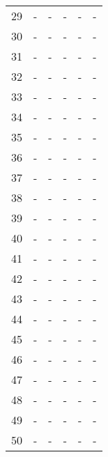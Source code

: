 \begin{table}
\begin{tabular}{llllll}
29 &   - &    - &    - &     - &        - \\
30 &   - &    - &    - &     - &        - \\
31 &   - &    - &    - &     - &        - \\
32 &   - &    - &    - &     - &        - \\
33 &   - &    - &    - &     - &        - \\
34 &   - &    - &    - &     - &        - \\
35 &   - &    - &    - &     - &        - \\
36 &   - &    - &    - &     - &        - \\
37 &   - &    - &    - &     - &        - \\
38 &   - &    - &    - &     - &        - \\
39 &   - &    - &    - &     - &        - \\
40 &   - &    - &    - &     - &        - \\
41 &   - &    - &    - &     - &        - \\
42 &   - &    - &    - &     - &        - \\
43 &   - &    - &    - &     - &        - \\
44 &   - &    - &    - &     - &        - \\
45 &   - &    - &    - &     - &        - \\
46 &   - &    - &    - &     - &        - \\
47 &   - &    - &    - &     - &        - \\
48 &   - &    - &    - &     - &        - \\
49 &   - &    - &    - &     - &        - \\
50 &   - &    - &    - &     - &        - \\
\bottomrule
\end{tabular}
\end{table}
